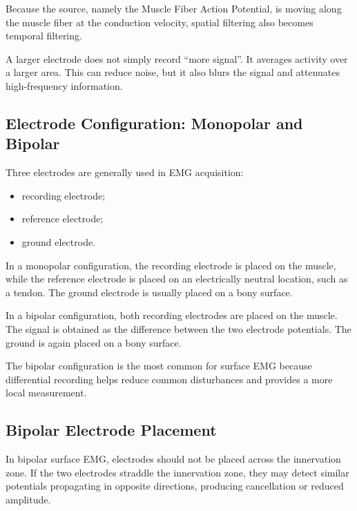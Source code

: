 Because the source, namely the Muscle Fiber Action Potential, is moving along the muscle fiber at the conduction velocity, spatial filtering also becomes temporal filtering.

\begin{authornote}
A larger electrode does not simply record ``more signal''. It averages activity over a larger area. This can reduce noise, but it also blurs the signal and attenuates high-frequency information.
\end{authornote}

\subsection{Electrode Configuration: Monopolar and Bipolar}

Three electrodes are generally used in EMG acquisition:

\begin{itemize}[noitemsep]
    \item recording electrode;
    \item reference electrode;
    \item ground electrode.
\end{itemize}

In a monopolar configuration, the recording electrode is placed on the muscle, while the reference electrode is placed on an electrically neutral location, such as a tendon. The ground electrode is usually placed on a bony surface.

In a bipolar configuration, both recording electrodes are placed on the muscle. The signal is obtained as the difference between the two electrode potentials. The ground is again placed on a bony surface.

\begin{authornote}
The bipolar configuration is the most common for surface EMG because differential recording helps reduce common disturbances and provides a more local measurement.
\end{authornote}

\subsection{Bipolar Electrode Placement}

In bipolar surface EMG, electrodes should not be placed across the innervation zone. If the two electrodes straddle the innervation zone, they may detect similar potentials propagating in opposite directions, producing cancellation or reduced amplitude.

